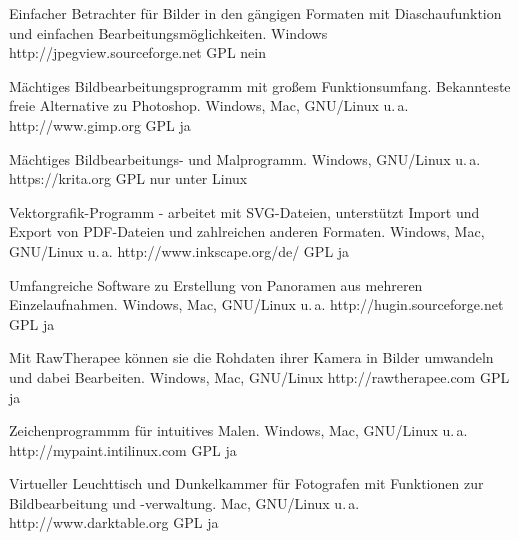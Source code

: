 



{Einfacher Betrachter für Bilder in den gängigen Formaten mit Diaschaufunktion und einfachen Bearbeitungsmöglichkeiten.}
{Windows}
{http://jpegview.sourceforge.net}
{GPL}
{nein}

{Mächtiges Bildbearbeitungsprogramm mit großem Funktionsumfang. Bekannteste freie Alternative zu Photoshop.}
{Windows, Mac, GNU/Linux u.\,a.}
{http://www.gimp.org}
{GPL}
{ja}

{Mächtiges Bildbearbeitungs- und Malprogramm.}
{Windows, GNU/Linux u.\,a.}
{https://krita.org}
{GPL}
{nur unter Linux}

{Vektorgrafik-Programm - arbeitet mit SVG-Dateien, unterstützt Import und Export von PDF-Dateien und zahlreichen anderen Formaten.}
{Windows, Mac, GNU/Linux u.\,a.}
{http://www.inkscape.org/de/}
{GPL}
{ja}


{Umfangreiche Software zu Erstellung von Panoramen aus mehreren Einzelaufnahmen.}
{Windows, Mac, GNU/Linux u.\,a.}
{http://hugin.sourceforge.net}
{GPL}
{ja}

{Mit RawTherapee können sie die Rohdaten ihrer Kamera in Bilder umwandeln und dabei Bearbeiten.}
{Windows, Mac, GNU/Linux}
{http://rawtherapee.com}
{GPL}
{ja}

{Zeichenprogrammm für intuitives Malen.}
{Windows, Mac, GNU/Linux u.\,a.}
{http://mypaint.intilinux.com}
{GPL}
{ja}

{Virtueller Leuchttisch und Dunkelkammer für Fotografen mit Funktionen zur Bildbearbeitung und -verwaltung.}
{Mac, GNU/Linux u.\,a.}
{http://www.darktable.org}
{GPL}
{ja}

\backpage


